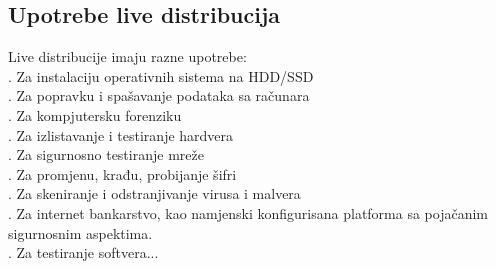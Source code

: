 \documentclass[12pt,vi]{mitthesis}
\begin{document}
\subsection*{Upotrebe live distribucija}
\indent
Live distribucije imaju razne upotrebe:\\
. Za instalaciju operativnih sistema na HDD/SSD\\
. Za popravku i spašavanje podataka sa računara\\
. Za kompjutersku forenziku\\
. Za izlistavanje i testiranje hardvera\\
. Za sigurnosno testiranje mreže\\
. Za promjenu, krađu, probijanje šifri\\
. Za skeniranje i odstranjivanje virusa i malvera\\
. Za internet bankarstvo, kao namjenski konfigurisana platforma sa pojačanim sigurnosnim aspektima.\\
. Za testiranje softvera...\\
\end{document}
